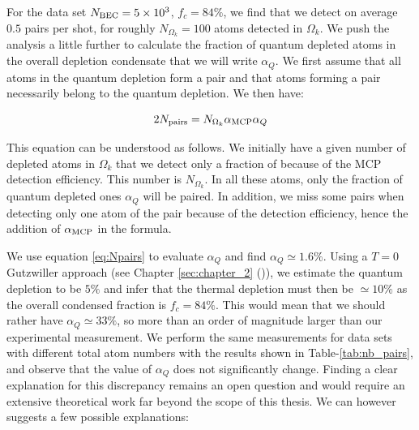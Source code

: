 For the data set $N_{\rm{BEC}}=5 \times 10^3$, $f_c=84 \%$, we find that we detect on average $0.5$ pairs per shot, for roughly $N_{\Omega_k}=100$ atoms detected in $\Omega_k$. We push the analysis a little further to calculate the fraction of quantum depleted atoms in the overall depletion condensate that we will write $\alpha_Q$. We first assume that all atoms in the quantum depletion form a \kmk pair and that atoms forming a \kmk pair necessarily belong to the quantum depletion. We then have:

\begin{equation}
    2N_{\rm{pairs}}= N_{\Omega_k} \alpha_{\rm{MCP}} \alpha_Q
    \label{eq:Npairs}
\end{equation}

\noindent This equation can be understood as follows. We initially have a given number of depleted atoms in $\Omega_k$ that we detect only a fraction of because of the MCP detection efficiency. This number is $N_{\Omega_k}$. In all these atoms, only the fraction of quantum depleted ones $\alpha_Q$ will be \kmk paired. In addition, we miss some pairs when detecting only one atom of the pair because of the detection efficiency, hence the addition of $\alpha_{\rm{MCP}}$ in the formula.

We use equation \ref{eq:Npairs} to evaluate $\alpha_Q$ and find $\alpha_Q \simeq 1.6 \%$. Using a $T=0$ Gutzwiller approach (see Chapter \ref{sec:chapter_2} ()), we estimate the quantum depletion to be $5\%$ and infer that the thermal depletion must then be $\simeq 10\%$ as the overall condensed fraction is $f_c=84 \%$. This would mean that we should rather have $\alpha_Q \simeq 33 \%$, so more than an order of magnitude larger than our experimental measurement. We perform the same measurements for data sets with different total atom numbers with the results shown in Table-\ref{tab:nb_pairs}, and observe that the value of $\alpha_Q$ does not significantly change. Finding a clear explanation for this discrepancy remains an open question and would require an extensive theoretical work far beyond the scope of this thesis. We can however suggests a few possible explanations:

